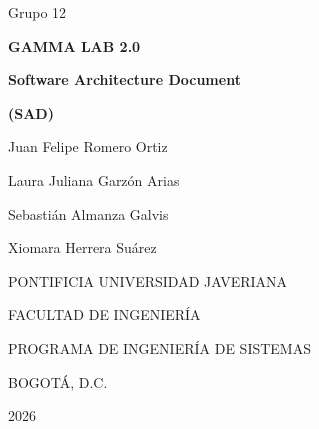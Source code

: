 \documentclass[11pt,a4paper]{article}
\DeclareRobustCommand{\_}{\textunderscore\allowbreak}
\begin{document}
\providecommand{\tituloProyecto}{GAMMA LAB 2.0}
\providecommand{\grupo}{Grupo 12}
\providecommand{\autorUno}{Juan Felipe Romero Ortiz}
\providecommand{\autorDos}{Laura Juliana Garzón Arias}
\providecommand{\autorTres}{Sebastián Almanza Galvis}
\providecommand{\autorCuatro}{Xiomara Herrera Suárez}
\providecommand{\leyendaGrado}{MEMORIA DE PROYECTO DE GRADO REALIZADO PARA CUMPLIR UNO DE
LOS REQUISITOS PARA EL TÍTULO EN INGENIERÍA DE SISTEMAS}
\providecommand{\director}{Ing. Cécile Gauthier Umaña}
\providecommand{\juradoUno}{Ing. Nombre del Primer Jurado}
\providecommand{\juradoDos}{Ing. Nombre del Segundo Jurado}
\providecommand{\universidad}{PONTIFICIA UNIVERSIDAD JAVERIANA}
\providecommand{\universidadNombre}{Pontificia Universidad Javeriana}
\providecommand{\facultad}{FACULTAD DE INGENIERÍA}
\providecommand{\programa}{PROGRAMA DE INGENIERÍA DE SISTEMAS}
\providecommand{\ciudad}{BOGOTÁ, D.C.}
\providecommand{\anio}{2026}
\providecommand{\fechaLarga}{Noviembre, 2026}
\providecommand{\rector}{Nombre del Rector, S.J.}
\providecommand{\decano}{Ing. Nombre del Decano de la Facultad}
\providecommand{\directorDepto}{Ing. Nombre del Director de Departamento, Ph.D.}
\providecommand{\directorCarrera}{Ing. Nombre de la Directora de Carrera}

\begingroup\setlength{\parskip}{0pt}%

\thispagestyle{empty}
\begin{center}
  \vspace*{1cm}
  {\large \grupo}\par\vspace{1.2cm}
  {\LARGE\bfseries \tituloProyecto}\par\vspace{1cm}
  {\Large\bfseries Software Architecture Document}\par\vspace{0.3cm}
  {\large\bfseries (SAD)}\par\vspace{2cm}
  \autorUno\par
  \autorDos\par
  \autorTres\par
  \autorCuatro\par
  \vfill
  \universidad\par
  \facultad\par
  \programa\par
  \ciudad\par
  \anio\par
  \vspace{1cm}
\end{center}
\clearpage
\end{document}

